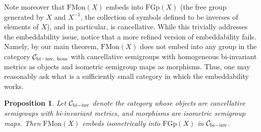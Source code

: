 \documentclass[11pt,a4paper,reqno]{amsart}
\numberwithin{equation}{section}
\theoremstyle{plain}
\newtheorem{proposition}[equation]{Proposition}
\theoremstyle{definition}
\begin{document}
Note moreover that $\mathrm{FMon}(X)$ embeds into $\mathrm{FGp}(X)$ (the
free group generated by $X$ and $X^{-1}$, the collection of symbols
defined to be inverses of elements of $X$), and in particular, is
cancellative. While this trivially addresses the embeddability issue,
notice that a more refined version of embeddability fails. Namely, by our
main theorem, $\mathrm{FMon}(X)$ does not embed into any group in the
category $\mathcal{C}_{\rm{bi-inv,\ hom}}$ with cancellative semigroups
with homogeneous bi-invariant metrics as objects and isometric semigroup
maps as morphisms. Thus, one may reasonably ask what is a sufficiently
small category in which the embeddability works.

\begin{proposition}\label{Pisometry}
Let $\mathcal{C}_{\rm{bi-inv}}$ denote the category whose objects are
cancellative semigroups with bi-invariant metrics, and morphisms are
isometric semigroup maps. Then $\mathrm{FMon}(X)$ embeds isometrically
into $\mathrm{FGp}(X)$ in $\mathcal{C}_{\rm{bi-inv}}$.
\end{proposition}
\end{document}
